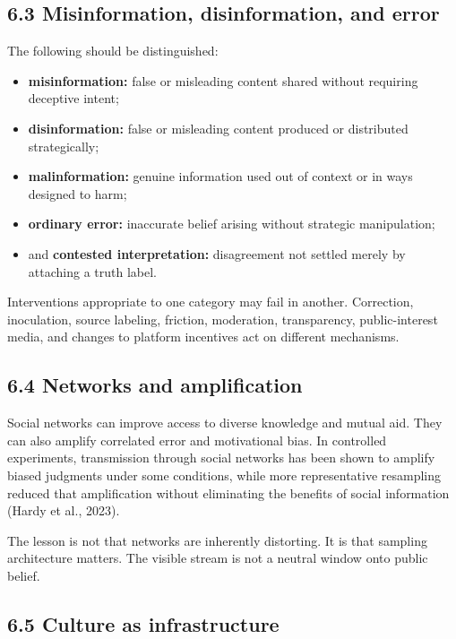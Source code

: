 \documentclass[
  11pt,
]{article}
\providecommand{\tightlist}{%
  \setlength{\itemsep}{0pt}\setlength{\parskip}{0pt}}
\begin{document}
\subsection{6.3 Misinformation, disinformation, and
error}\label{misinformation-disinformation-and-error}

The following should be distinguished:

\begin{itemize}
\tightlist
\item
  \textbf{misinformation:} false or misleading content shared without
  requiring deceptive intent;
\item
  \textbf{disinformation:} false or misleading content produced or
  distributed strategically;
\item
  \textbf{malinformation:} genuine information used out of context or in
  ways designed to harm;
\item
  \textbf{ordinary error:} inaccurate belief arising without strategic
  manipulation;
\item
  and \textbf{contested interpretation:} disagreement not settled merely
  by attaching a truth label.
\end{itemize}

Interventions appropriate to one category may fail in another.
Correction, inoculation, source labeling, friction, moderation,
transparency, public-interest media, and changes to platform incentives
act on different mechanisms.

\subsection{6.4 Networks and
amplification}\label{networks-and-amplification}

Social networks can improve access to diverse knowledge and mutual aid.
They can also amplify correlated error and motivational bias. In
controlled experiments, transmission through social networks has been
shown to amplify biased judgments under some conditions, while more
representative resampling reduced that amplification without eliminating
the benefits of social information (Hardy et al., 2023).

The lesson is not that networks are inherently distorting. It is that
sampling architecture matters. The visible stream is not a neutral
window onto public belief.

\subsection{6.5 Culture as
infrastructure}\label{culture-as-infrastructure}
\end{document}
